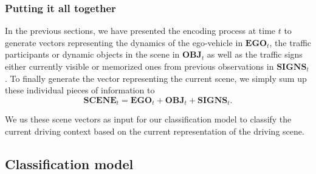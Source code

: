 \subsubsection{Putting it all together}%
\label{ssubsec:putting_it_all_together}

In the previous sections, we have presented the encoding process at time $t$ to generate vectors representing the dynamics of the ego-vehicle in $ \mathbf{EGO}_{t}$, the traffic participants or dynamic objects in the scene in $ \mathbf{OBJ}_{t}$ as well as the traffic signs either currently visible or memorized ones from previous observations in $ \mathbf{SIGNS}_{t}$.
To finally generate the vector representing the current scene, we simply sum up these individual pieces of information to
\begin{equation}
\label{eq:context_class_scene_vec}
\mathbf{SCENE}_{t} = \mathbf{EGO}_t + \mathbf{OBJ}_t + \mathbf{SIGNS}_t.
\end{equation}

We us these scene vectors as input for our classification model to classify the current driving context based on the current representation of the driving scene.

\subsection{Classification model}%
\label{subsec:classification_model}

